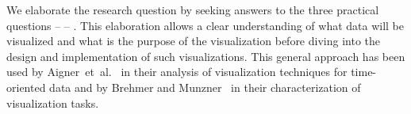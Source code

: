 %

We elaborate the research question by seeking answers to the three practical questions  --  -- . This elaboration allows a clear understanding of what data will be visualized and what is the purpose of the visualization before diving into the design and implementation of such visualizations. This general approach has been used by Aigner~et~al.~\cite{Aigner2011} in their analysis of visualization techniques for time-oriented data and by Brehmer and Munzner~\cite{Brehmer2013} in their characterization of visualization tasks.

